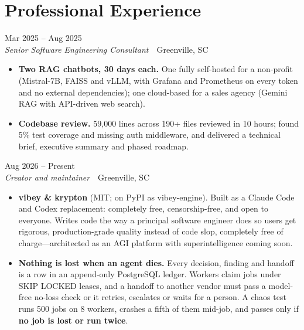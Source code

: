 \documentclass[10pt,letterpaper]{article}
\newcommand{\szmeta}{\fontsize{8pt}{10pt}\selectfont}
\begin{document}
\section*{Professional Experience}
\vspace{0pt}
 \hfill {\color{muted}\szmeta Mar 2025 – Aug 2025}\\[1pt]
{\itshape Senior Software Engineering Consultant}{\color{muted}\ \textbullet\ Greenville, SC}
\vspace{2pt}
\begin{itemize}
\item \textbf{Two RAG chatbots, 30 days each.} One fully self-hosted for a non-profit (Mistral-7B, FAISS and vLLM, with Grafana and Prometheus on every token and no external dependencies); one cloud-based for a sales agency (Gemini RAG with API-driven web search).
\item \textbf{Codebase review.} 59,000 lines across 190+ files reviewed in 10 hours; found 5\% test coverage and missing auth middleware, and delivered a technical brief, executive summary and phased roadmap.
\end{itemize}
\vspace{3pt}
 \hfill {\color{muted}\szmeta Aug 2026 – Present}\\[1pt]
{\itshape Creator and maintainer}{\color{muted}\ \textbullet\ Greenville, SC}
\vspace{2pt}
\begin{itemize}
\item \textbf{vibey \& krypton} {\color{muted}(MIT; on PyPI as vibey-engine)}. Built as a Claude Code and Codex replacement: completely free, censorship-free, and open to everyone. Writes code the way a principal software engineer does so users get rigorous, production-grade quality instead of code slop, completely free of charge—architected as an AGI platform with superintelligence coming soon.
\item \textbf{Nothing is lost when an agent dies.} Every decision, finding and handoff is a row in an append-only PostgreSQL ledger. Workers claim jobs under SKIP LOCKED leases, and a handoff to another vendor must pass a model-free no-loss check or it retries, escalates or waits for a person. A chaos test runs 500 jobs on 8 workers, crashes a fifth of them mid-job, and passes only if \textbf{no job is lost or run twice}.
\end{itemize}
\end{document}
